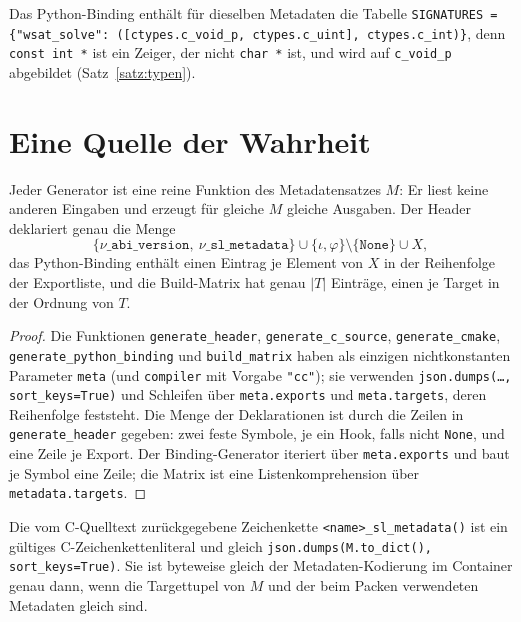 Das Python-Binding enthält für dieselben Metadaten die Tabelle \texttt{SIGNATURES = \{"wsat\_solve": ([ctypes.c\_void\_p, ctypes.c\_uint], ctypes.c\_int)\}}, denn \texttt{const int *} ist ein Zeiger, der nicht \texttt{char *} ist, und wird auf \texttt{c\_void\_p} abgebildet (Satz~\ref{satz:typen}).

\section{Eine Quelle der Wahrheit}

\begin{satz}
	\label{satz:schichtkonsistenz}
	Jeder Generator ist eine reine Funktion des Metadatensatzes $M$: Er liest keine anderen Eingaben und erzeugt für gleiche $M$ gleiche Ausgaben. Der Header deklariert genau die Menge
	\[
	\{\nu\texttt{\_abi\_version},\ \nu\texttt{\_sl\_metadata}\}\cup\{\iota,\varphi\}\setminus\{\texttt{None}\}\cup X,
	\]
	das Python-Binding enthält einen Eintrag je Element von $X$ in der Reihenfolge der Exportliste, und die Build-Matrix hat genau $|T|$ Einträge, einen je Target in der Ordnung von $T$.
\end{satz}

\begin{proof}
	Die Funktionen \texttt{generate\_header}, \texttt{generate\_c\_source}, \texttt{generate\_cmake}, \texttt{generate\_python\_binding} und \texttt{build\_matrix} haben als einzigen nichtkonstanten Parameter \texttt{meta} (und \texttt{compiler} mit Vorgabe \texttt{"cc"}); sie verwenden \texttt{json.dumps(\ldots, sort\_keys=True)} und Schleifen über \texttt{meta.exports} und \texttt{meta.targets}, deren Reihenfolge feststeht. Die Menge der Deklarationen ist durch die Zeilen in \texttt{generate\_header} gegeben: zwei feste Symbole, je ein Hook, falls nicht \texttt{None}, und eine Zeile je Export. Der Binding-Generator iteriert über \texttt{meta.exports} und baut je Symbol eine Zeile; die Matrix ist eine Listenkomprehension über \texttt{metadata.targets}.
\end{proof}

\begin{lemma}
	\label{lem:eingebettet}
	Die vom C-Quelltext zurückgegebene Zeichenkette \texttt{<name>\_sl\_metadata()} ist ein gültiges C-Zeichenkettenliteral und gleich \texttt{json.dumps(M.to\_dict(), sort\_keys=True)}. Sie ist byteweise gleich der Metadaten-Kodierung im Container genau dann, wenn die Targettupel von $M$ und der beim Packen verwendeten Metadaten gleich sind.
\end{lemma}

